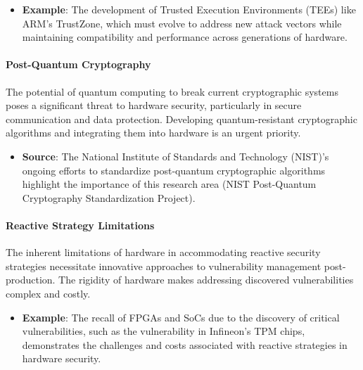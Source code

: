 \begin{itemize}
\item
  \textbf{Example}: The development of Trusted Execution Environments
  (TEEs) like ARM's TrustZone, which must evolve to address new attack
  vectors while maintaining compatibility and performance across
  generations of hardware.
\end{itemize}

\hypertarget{post-quantum-cryptography}{%
\paragraph{Post-Quantum Cryptography}\label{post-quantum-cryptography}}

The potential of quantum computing to break current cryptographic
systems poses a significant threat to hardware security, particularly in
secure communication and data protection. Developing quantum-resistant
cryptographic algorithms and integrating them into hardware is an urgent
priority.

\begin{itemize}
\item
  \textbf{Source}: The National Institute of Standards and Technology
  (NIST)'s ongoing efforts to standardize post-quantum cryptographic
  algorithms highlight the importance of this research area (NIST
  Post-Quantum Cryptography Standardization Project).
\end{itemize}

\hypertarget{reactive-strategy-limitations}{%
\paragraph{Reactive Strategy
Limitations}\label{reactive-strategy-limitations}}

The inherent limitations of hardware in accommodating reactive security
strategies necessitate innovative approaches to vulnerability management
post-production. The rigidity of hardware makes addressing discovered
vulnerabilities complex and costly.

\begin{itemize}
\item
  \textbf{Example}: The recall of FPGAs and SoCs due to the discovery of
  critical vulnerabilities, such as the vulnerability in Infineon's TPM
  chips, demonstrates the challenges and costs associated with reactive
  strategies in hardware security.
\end{itemize}

